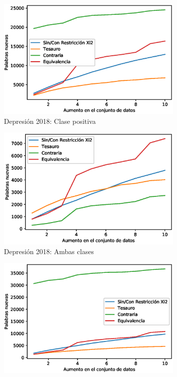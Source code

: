 \begin{figure}[hbt!]
    \begin{subfigure}[b]{0.5\textwidth}
        \includegraphics[width=\textwidth]{sections/figures/pos_2018.eps}
        \caption{Depresión 2018: Clase positiva}
    \end{subfigure}
    \hfill
    \begin{subfigure}[b]{0.5\textwidth}
        \includegraphics[width=\textwidth]{sections/figures/both2018.eps}
        \caption{Depresión 2018: Ambas clases}
    \end{subfigure}
    \hfill
    \begin{subfigure}[b]{0.5\textwidth}
        \includegraphics[width=\textwidth]{sections/figures/pos2019.eps}

\end{subfigure}
\end{figure}
